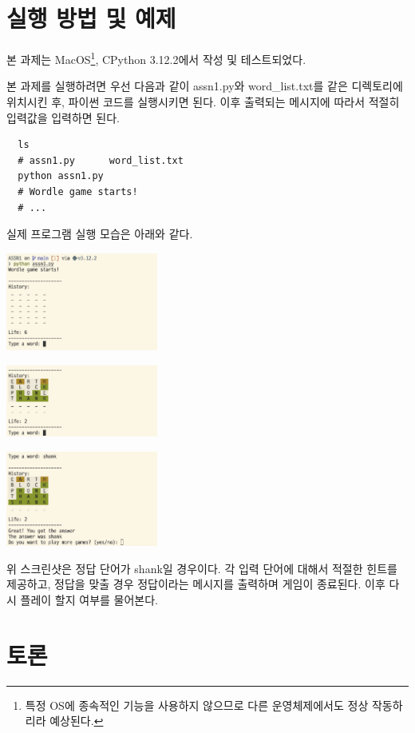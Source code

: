 \documentclass{article}
\begin{document}
\section{실행 방법 및 예제}

본 과제는 MacOS\footnote{특정 OS에 종속적인 기능을 사용하지 않으므로 다른 운영체제에서도 정상 작동하리라 예상된다.}, CPython 3.12.2에서 작성 및 테스트되었다.

본 과제를 실행하려면 우선 다음과 같이 assn1.py와 word\_list.txt를 같은 디렉토리에 위치시킨 후,
파이썬 코드를 실행시키면 된다. 이후 출력되는 메시지에 따라서 적절히 입력값을 입력하면 된다.
\begin{verbatim}
  ls
  # assn1.py      word_list.txt
  python assn1.py
  # Wordle game starts!
  # ...
\end{verbatim}

실제 프로그램 실행 모습은 아래와 같다.

\includegraphics[width=5cm]{start.png}

\includegraphics[width=5cm]{middle.png}

\includegraphics[width=5cm]{end.png}

위 스크린샷은 정답 단어가 shank일 경우이다.
각 입력 단어에 대해서 적절한 힌트를 제공하고, 정답을 맞출 경우 정답이라는 메시지를 출력하며
게임이 종료된다. 이후 다시 플레이 할지 여부를 물어본다.

\section{토론}
\end{document}
